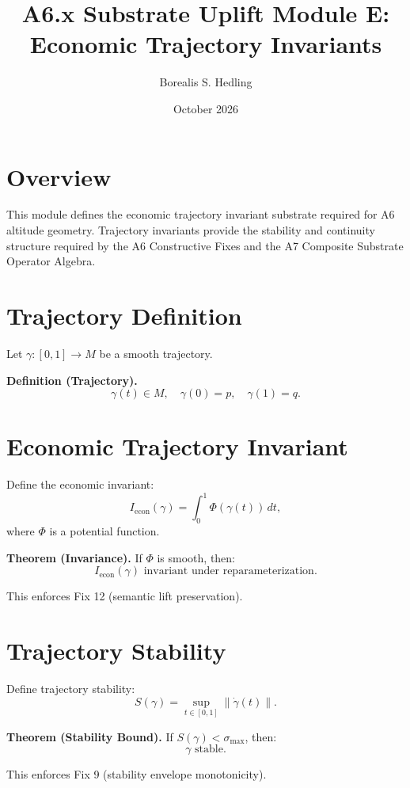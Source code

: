 \documentclass[11pt]{article}
\title{A6.x Substrate Uplift Module E: Economic Trajectory Invariants}
\author{Borealis S. Hedling}
\date{October 2026}
\begin{document}
\maketitle

\section*{Overview}

This module defines the economic trajectory invariant substrate required for
A6 altitude geometry. Trajectory invariants provide the stability and continuity
structure required by the A6 Constructive Fixes and the A7 Composite Substrate
Operator Algebra.

\section{Trajectory Definition}

Let $\gamma : [0,1] \to M$ be a smooth trajectory.

\textbf{Definition (Trajectory).}
\[
\gamma(t) \in M, \quad \gamma(0) = p, \quad \gamma(1) = q.
\]

\section{Economic Trajectory Invariant}

Define the economic invariant:
\[
I_{\mathrm{econ}}(\gamma) = \int_0^1 \Phi(\gamma(t)) \, dt,
\]
where $\Phi$ is a potential function.

\textbf{Theorem (Invariance).}
If $\Phi$ is smooth, then:
\[
I_{\mathrm{econ}}(\gamma) \text{ invariant under reparameterization}.
\]

This enforces Fix 12 (semantic lift preservation).

\section{Trajectory Stability}

Define trajectory stability:
\[
S(\gamma) = \sup_{t \in [0,1]} \|\dot{\gamma}(t)\|.
\]

\textbf{Theorem (Stability Bound).}
If $S(\gamma) < \sigma_{\max}$, then:
\[
\gamma \text{ stable}.
\]

This enforces Fix 9 (stability envelope monotonicity).
\end{document}
